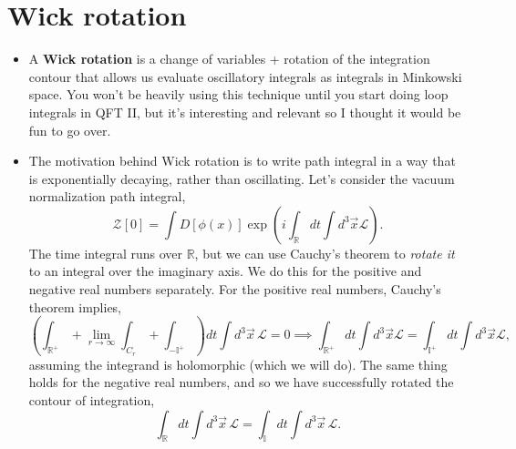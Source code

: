 \documentclass[12pt, oneside]{article}   	%
\theoremstyle{definition}
\begin{document}
\section*{Wick rotation}
\begin{itemize}
	\item A \textbf{Wick rotation} is a change of variables + rotation of the integration contour that allows us evaluate oscillatory integrals as integrals in Minkowski space. You won't be heavily using this technique until you start doing loop integrals in QFT II, but it's interesting and relevant so I thought it would be fun to go over. 
	
	\item The motivation behind Wick rotation is to write path integral in a way that is exponentially decaying, rather than oscillating. Let's consider the vacuum normalization path integral,
	\begin{equation}
		\mathcal Z[0] = \int D[\phi(x)] \exp \left( i\int_\mathbb{R} dt \int d^3\vec x \mathcal L \right). 
	\end{equation}
	The time integral runs over $\mathbb R$, but we can use Cauchy's theorem to \textit{rotate it} to an integral over the imaginary axis. We do this for the positive and negative real numbers separately. For the positive real numbers, Cauchy's theorem implies,
	\begin{equation}
		\left(\int_{\mathbb R^+} + \lim_{r\rightarrow\infty} \int_{C_r} + \int_{-\mathbb I^+}\right) dt \int d^3\vec x\, \mathcal L = 0\implies \int_{\mathbb R^+} dt \int d^3\vec x \mathcal L = \int_{\mathbb I^+} dt\int d^3\vec x \mathcal L,
	\end{equation}
	assuming the integrand is holomorphic (which we will do). The same thing holds for the negative real numbers, and so we have successfully rotated the contour of integration,
	\begin{equation}
		\int_{\mathbb R} dt\int d^3\vec x\, \mathcal L = \int_{\mathbb I} dt\int d^3\vec x\, \mathcal L.  \label{eq:contour_rotation}
	\end{equation}
	

\end{itemize}
\end{document}
